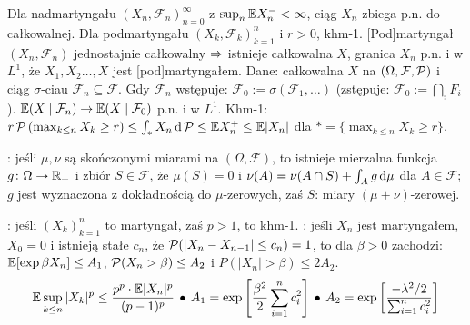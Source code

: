 Dla nadmartyngału $(X_n, \mathcal F_n)_{n=0}^\infty$ z $\sup_n \mathbb{E} X_n^- < \infty$, ciąg $X_n$ zbiega p.n. do całkowalnej.
Dla  podmartyngału $(X_k, \mathcal F_k)_{k=1}^n$ i $r > 0$, khm-1.
[Pod]martyngał  $(X_n, \mathcal F_n)$  jednostajnie całkowalny $\Rightarrow$ istnieje całkowalna $X$, granica $X_n$ p.n. i w $L^1$, że $X_1, X_2 \dots, X$ jest [pod]martyngałem.
Dane: całkowalna $X$ na $(\Omega, \mathcal F, \operatorname{\mathcal{P}})$ i ciąg $\sigma$-ciau $\mathcal F_n \subseteq \mathcal F$.
Gdy $\mathcal F_n$ wstępuje: $\mathcal F_0 := \sigma (\mathcal F_1, \ldots)$ (zstępuje: $\mathcal F_0 := \bigcap_i F_i$).
$\mathbb{E} (X \mid \mathcal F_n) \to \mathbb{E} (X \mid \mathcal F_0)$ p.n. i w $L^1$.
\hfill Khm-1: $r \operatorname{\mathcal{P}} \left(\max_{k \le n} X_k \ge r\right) \le \int_* X_n \, \textrm{d} \operatorname{\mathcal{P}} \le \mathbb{E} X_n^+ \le \mathbb{E} |X_n|$ dla $* = \{\max_{k\le n} X_k \ge r\}$.

:  jeśli $\mu, \nu$ są skończonymi miarami na $(\Omega, \mathcal F)$, to istnieje mierzalna funkcja $g \colon \Omega \to \mathbb{R}_+$ i zbiór $S \in \mathcal F$, że $\mu (S) = 0$ i $\nu (A) = \nu (A \cap S) + \int_A g \, \textrm{d} \mu$ dla $A \in \mathcal F$; $g$ jest wyznaczona z dokładnością do $\mu$-zerowych, zaś $S$: miary $(\mu+\nu)$-zerowej.

:  jeśli $(X_k)_{k=1}^n$ to martyngał, zaś $p > 1$, to khm-1.
: jeśli $X_n$ jest martyngałem, $X_0 = 0$ i istnieją stałe $c_n$, że $\operatorname{\mathcal{P}} (|X_n - X_{n-1}| \le c_n) = 1$, to dla $\beta > 0$ zachodzi: $\mathbb{E} [\exp \beta X_n] \le A_1$, $\operatorname{\mathcal{P}} (X_n > \beta) \le A_2$ i $P(|X_n| > \beta) \le 2A_2$.
\[
	\mathbb{E} \sup_{k\le n} |X_k|^p \le \frac{p^p \cdot \mathbb{E} |X_n|^p}{(p-1)^p} \, \bullet \,
	A_1 = \exp \left[ \frac{\beta^2}{2} \sum_{i=1}^n c_i^2\right] \, \bullet \,
	A_2 = \exp \left[ \frac{-\lambda^2 / 2}{\sum_{i=1}^n c_i^2} \right]
\]